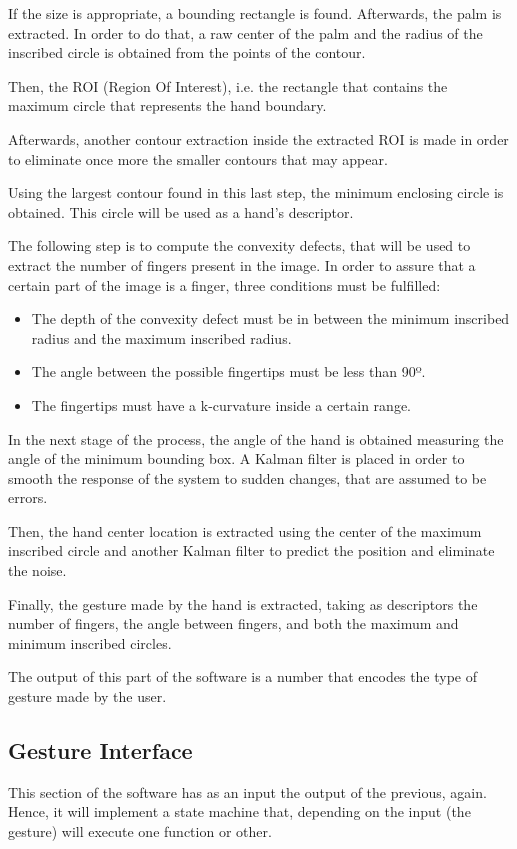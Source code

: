 \documentclass{article}
\begin{document}
If the size is appropriate, a bounding rectangle is found. Afterwards, the palm is extracted. In order to do that, a raw center of the palm and the radius of the inscribed circle is obtained from the points of the contour.

Then, the ROI (Region Of Interest), i.e. the rectangle that contains the maximum circle that represents the hand boundary.  

Afterwards, another contour extraction inside the extracted ROI is made in order to eliminate once more the smaller contours that may appear. 

Using the largest contour found in this last step, the minimum enclosing circle is obtained. This circle will be used as a hand's descriptor.

The following step is to compute the convexity defects, that will be used to extract the number of fingers present in the image. 
In order to assure that a certain part of the image is a finger, three conditions must be fulfilled: 
\begin{itemize}
\item The depth of the convexity defect must be in between the minimum inscribed radius and the maximum inscribed radius. 
\item The angle between the possible fingertips must be less than 90º. 
\item The fingertips must have a k-curvature inside a certain range.
\end{itemize}

In the next stage of the process, the angle of the hand is obtained measuring the angle of the minimum bounding box. A Kalman filter is placed in order to smooth the response of the system to sudden changes, that are assumed to be errors. 

Then, the hand center location is extracted using the center of the maximum inscribed circle and another Kalman filter to predict the position and eliminate the noise. 

Finally, the gesture made by the hand is extracted, taking as descriptors the number of fingers, the angle between fingers, and both the maximum and minimum inscribed circles. 

The output of this part of the software is a number that encodes the type of gesture made by the user.


\subsection{Gesture Interface} 
This section of the software has as an input the output of the previous, again. Hence, it will implement a state machine that, depending on the input (the gesture) will execute one function or other. 
\end{document}
